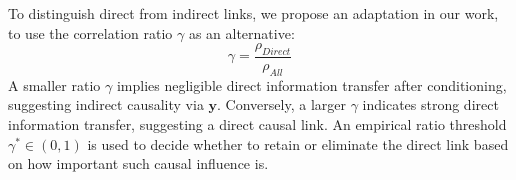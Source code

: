 To distinguish direct from indirect links, we propose an adaptation in our work, to use the correlation ratio $\gamma$ as an alternative:
\begin{equation}
    \gamma=\frac{\rho_{Direct}}{\rho_{All}}
\end{equation}
A smaller ratio $\gamma$ implies negligible direct information transfer after conditioning, suggesting indirect causality via $\textbf{y}$. Conversely, a larger $\gamma$ indicates strong direct information transfer, suggesting a direct causal link. An empirical ratio threshold $\gamma^* \in (0, 1)$ is used to decide whether to retain or eliminate the direct link based on how important such causal influence is.
